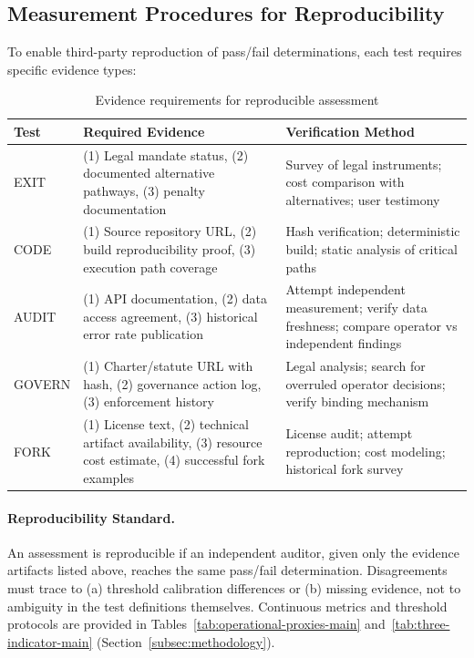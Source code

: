 \documentclass{article}
\begin{document}
\subsection{Measurement Procedures for Reproducibility}
\label{subsec:measurement}

To enable third-party reproduction of pass/fail determinations, each test requires specific evidence types:

\begin{table}[htbp]
\centering
\small
\caption{Evidence requirements for reproducible assessment}
\label{tab:evidence-requirements}
\begin{tabular}{@{}lp{5cm}p{5cm}@{}}
\toprule
\textbf{Test} & \textbf{Required Evidence} & \textbf{Verification Method} \\
\midrule
EXIT & (1) Legal mandate status, (2) documented alternative pathways, (3) penalty documentation & Survey of legal instruments; cost comparison with alternatives; user testimony \\
CODE & (1) Source repository URL, (2) build reproducibility proof, (3) execution path coverage & Hash verification; deterministic build; static analysis of critical paths \\
AUDIT & (1) API documentation, (2) data access agreement, (3) historical error rate publication & Attempt independent measurement; verify data freshness; compare operator vs independent findings \\
GOVERN & (1) Charter/statute URL with hash, (2) governance action log, (3) enforcement history & Legal analysis; search for overruled operator decisions; verify binding mechanism \\
FORK & (1) License text, (2) technical artifact availability, (3) resource cost estimate, (4) successful fork examples & License audit; attempt reproduction; cost modeling; historical fork survey \\
\bottomrule
\end{tabular}
\end{table}

\paragraph{Reproducibility Standard.} An assessment is reproducible if an independent auditor, given only the evidence artifacts listed above, reaches the same pass/fail determination. Disagreements must trace to (a) threshold calibration differences or (b) missing evidence, not to ambiguity in the test definitions themselves. Continuous metrics and threshold protocols are provided in Tables~\ref{tab:operational-proxies-main} and~\ref{tab:three-indicator-main} (Section~\ref{subsec:methodology}).
\end{document}
